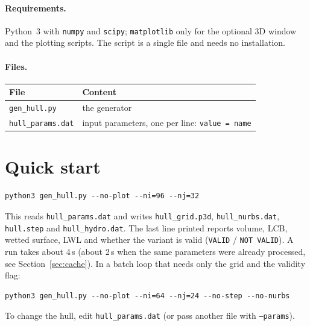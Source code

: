 \documentclass[11pt,a4paper]{article}
\newcommand{\cmd}[1]{\texttt{#1}}
\begin{document}
\paragraph{Requirements.} Python~3 with \cmd{numpy} and \cmd{scipy}; \cmd{matplotlib} only for
the optional 3D window and the plotting scripts. The script is a single file and needs no
installation.

\paragraph{Files.}
\begin{longtable}{L{4.9cm}L{10.4cm}}
\toprule
File & Content \\ \midrule
\cmd{gen\_hull.py} & the generator \\
\cmd{hull\_params.dat} & input parameters, one per line: \cmd{value = name} \\
\bottomrule
\end{longtable}

\section{Quick start}
\begin{lstlisting}
python3 gen_hull.py --no-plot --ni=96 --nj=32
\end{lstlisting}
This reads \cmd{hull\_params.dat} and writes \cmd{hull\_grid.p3d}, \cmd{hull\_nurbs.dat},
\cmd{hull.step} and \cmd{hull\_hydro.dat}. The last line printed reports volume, LCB, wetted
surface, LWL and whether the variant is valid (\cmd{VALID} / \cmd{NOT VALID}).
A run takes about 4\,s (about 2\,s when the same parameters were already processed, see
Section~\ref{sec:cache}). In a batch loop that needs only the grid and the validity flag:
\begin{lstlisting}
python3 gen_hull.py --no-plot --ni=64 --nj=24 --no-step --no-nurbs
\end{lstlisting}

To change the hull, edit \cmd{hull\_params.dat} (or pass another file with \cmd{--params}).

\end{document}
